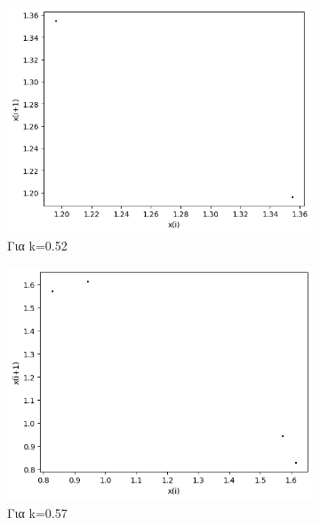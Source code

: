 \begin{figure}[h!]
\begin{subfigure}[b]{0.25\textwidth}
		\centering
		\includegraphics[width=\textwidth]{LateX images/graphs q07/g5}
		\caption{Για k=0.52}
		\label{f:k39}
	\end{subfigure}
	\begin{subfigure}[b]{0.25\textwidth}
		\centering
		\includegraphics[width=\textwidth]{LateX images/graphs q07/g6}
		\caption{Για k=0.57}
		\label{f:k40}
	\end{subfigure}
	\hfill
	\begin{subfigure}[b]{0.25\textwidth}
		\centering

\end{subfigure}
\end{figure}
